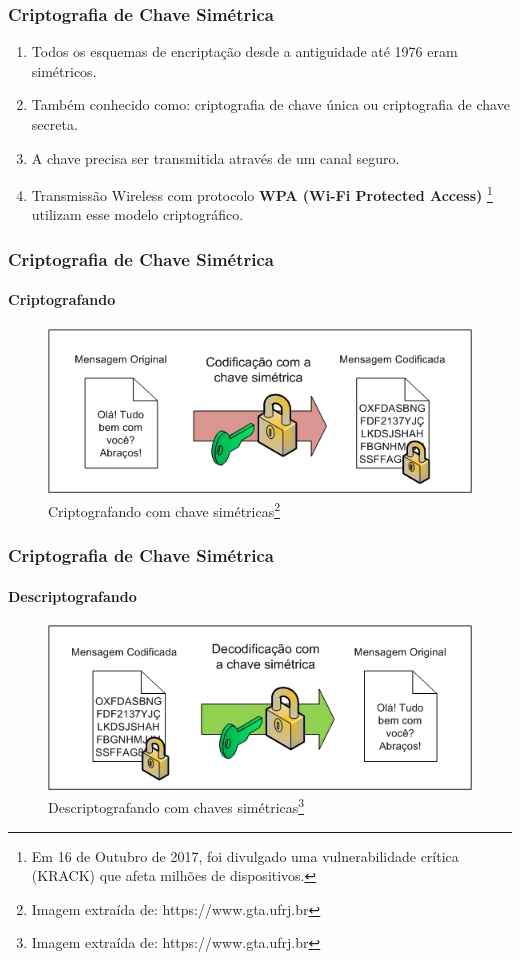 \documentclass[compress]{beamer}
\begin{document}
\begin{frame}
\frametitle{Criptografia de Chave Simétrica}
\begin{enumerate}
	\item<+->{Todos os esquemas de encriptação desde a antiguidade até 1976 eram simétricos.}
	\item<+->{Também conhecido como: criptografia de chave única ou criptografia de chave secreta.}
	\item<+->{A chave precisa ser transmitida através de um canal seguro.}
	\item<+->{Transmissão Wireless com protocolo \textbf{WPA (Wi-Fi Protected Access)} \footnote{Em 16 de Outubro de 2017, foi divulgado uma vulnerabilidade crítica (KRACK) que afeta milhões de dispositivos.} utilizam esse modelo criptográfico.}
\end{enumerate}
\end{frame}

\begin{frame}
\frametitle{Criptografia de Chave Simétrica}
\framesubtitle{Criptografando}
	\begin{figure}[h]
		\includegraphics[width=\textwidth]{pics/chave_simetrica_1}
		\caption{Criptografando com chave simétricas\footnote{Imagem extraída de: https://www.gta.ufrj.br}}		
	\end{figure}
\end{frame}

\begin{frame}
\frametitle{Criptografia de Chave Simétrica}
\framesubtitle{Descriptografando}
\begin{figure}[h]
	\includegraphics[width=\textwidth]{pics/chave_simetrica_2}
	\caption{Descriptografando com chaves simétricas\footnote{Imagem extraída de: https://www.gta.ufrj.br}}		
\end{figure}
\end{frame}
\end{document}
